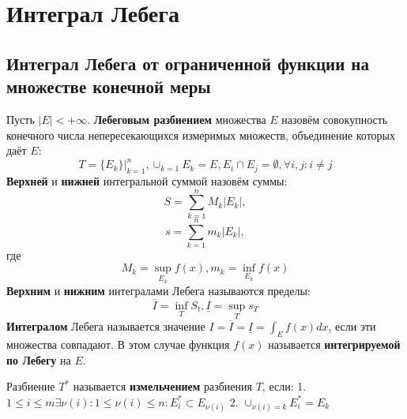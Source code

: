 \documentclass[11pt]{article}
\begin{document}
\section{Интеграл Лебега}
\label{sec:org68aa73b}
\subsection{Интеграл Лебега от ограниченной функции на множестве конечной меры}
\label{sec:orgc078779}
Пусть \(|E| < +\infty\). \textbf{Лебеговым разбиением} множества \(E\) назовём совокупность конечного
числа непересекающихся измеримых множеств, объединение которых даёт \(E\):
\begin{equation}
T = \{E_k\}|_{k = 1}^n, \cup_{k = 1}E_k = E, E_i \cap E_j = \emptyset, \forall i, j: i \neq j
\end{equation}
\textbf{Верхней} и \textbf{нижней} интегральной суммой назовём суммы:
\begin{equation}
S = \sum_{k = 1}^nM_k|E_k|,
\end{equation}
\begin{equation}
s = \sum_{k = 1}^nm_k|E_k|,
\end{equation}
где
\begin{equation}
M_k = \sup_{E_k}f(x), m_k = \inf_{E_k}f(x)
\end{equation}
\textbf{Верхним} и \textbf{нижним} интегралами Лебега называются пределы:
\begin{equation}
\overline{I} = \inf_TS_t, \underline{I} = \sup_{T}s_T
\end{equation}
\textbf{Интегралом} Лебега называется значение \(I = \overline{I} = \underline{I} = \int_Ef(x)dx\),
если эти множества совпадают. В этом случае функция \(f(x)\) называется \textbf{интегрируемой по Лебегу}
на \(E\).

Разбиение \(T^*\) называется \textbf{измельчением} разбиения \(T\), если:
1. $1 \leq i \leq m \exists \nu(i): 1 \leq \nu(i) \leq n: E_i^* \subset E_{\nu(i)}$
2. $\cup_{\nu(i) = k}E^*_i = E_k$
\end{document}
